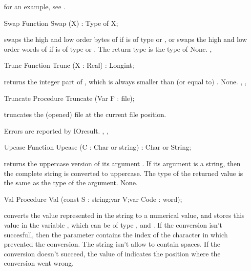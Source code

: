 \documentclass{report}
\begin{document}
for an example, see .
\begin{function}{Swap}
\Declaration
Function Swap (X) : Type of X;

\Description
{} swaps the high and low order bytes of  if  is of
type  or , or swaps the high and low order words of
 if  is of type  or .
The return type is the type of 
\Errors
None.
\SeeAlso
{}, 
\end{function}
\html{}
\begin{function}{Trunc}
\Declaration
Function Trunc (X : Real) : Longint;

\Description
{} returns the integer part of ,
which is always smaller than (or equal to)  .
\Errors
None.
\SeeAlso
{}, , 
\end{function}
\html{}
\begin{procedure}{Truncate}
\Declaration
Procedure Truncate (Var F : file);

\Description
{} truncates the (opened) file  at the current file
position.

\Errors
Errors are reported by IOresult.
\SeeAlso
{}, ,
\end{procedure}
\html{}
\begin{function}{Upcase}
\Declaration
Function Upcase (C : Char or string) : Char or String;

\Description
{} returns the uppercase version of its argument .
If its argument is a string, then the complete string is converted to
uppercase. The type of the returned value is the same as the type of the
argument.
\Errors
None.
\SeeAlso
{}
\end{function}
\html{}
\begin{procedure}{Val}
\Declaration
Procedure Val (const S : string;var V;var Code : word);

\Description
{} converts the value represented in the string  to a numerical
value, and stores this value in the variable , which
can be of type ,  and .
If the conversion isn't succesfull, then the parameter  contains
the index of the character in  which prevented the conversion.
The string  isn't allow to contain spaces.
\Errors
If the conversion doesn't succeed, the value of  indicates the
position where the conversion went wrong.
\SeeAlso
{}
\end{procedure}
\end{document}
